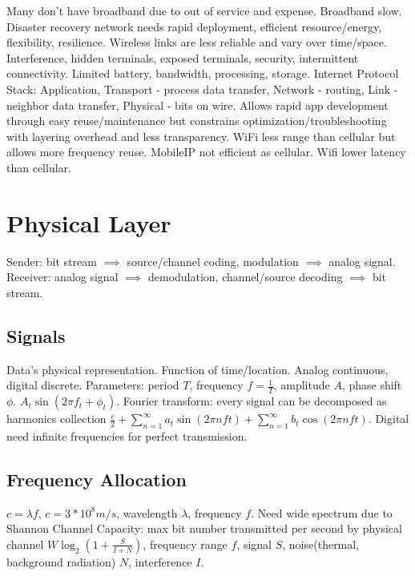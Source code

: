 \documentclass[9pt]{extarticle}
\begin{document}
\begin{multicols}{2}

Many don't have broadband due to out of service and expense. Broadband slow. Disaster recovery network needs rapid deployment, efficient resource/energy, flexibility, resilience. Wireless links are less reliable and vary over time/space. Interference, hidden terminals, exposed terminals, security, intermittent connectivity. Limited battery, bandwidth, processing, storage. Internet Protocol Stack: Application, Transport - process data transfer, Network - routing, Link - neighbor data transfer, Physical - bits on wire. Allows rapid app development through easy reuse/maintenance but constrains optimization/troubleshooting with layering overhead and less transparency. WiFi less range than cellular but allows more frequency reuse. MobileIP not efficient as cellular. Wifi lower latency than cellular.

\section{Physical Layer}

Sender: bit stream $\implies$ source/channel coding, modulation $\implies$ analog signal. Receiver: analog signal $\implies$ demodulation, channel/source decoding $\implies$ bit stream.

\subsection{Signals} 

Data's physical representation. Function of time/location. Analog continuous, digital discrete. Parameters: period $T$, frequency $f = \frac{1}{T}$, amplitude $A$, phase shift $\phi$. $A_t\sin{(2\pi{f_t}+\phi_t)}$. Fourier transform: every signal can be decomposed as harmonics collection $\frac{c}{2}+\sum_{n=1}^{\infty}a_t\sin{(2\pi{n}ft)} + \sum_{n=1}^{\infty}b_t\cos{(2\pi{n}ft)}$. Digital need infinite frequencies for perfect transmission.

\subsection{Frequency Allocation}
 
$c=\lambda{f}$, $c=3*10^8m/s$, wavelength $\lambda$, frequency $f$. Need wide spectrum due to Shannon Channel Capacity: max bit number transmitted per second by physical channel $W\log_2{(1+\frac{S}{I+N})}$, frequency range $f$, signal $S$, noise(thermal, background radiation) $N$, interference $I$. 


\end{multicols}
\end{document}
